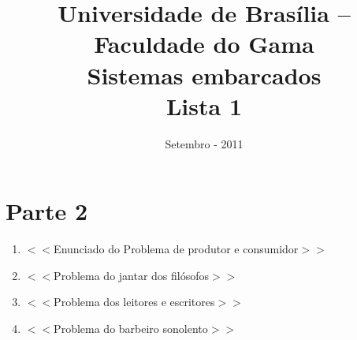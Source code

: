 \documentclass[a4paper,10pt]{article}
\title{ \textbf{Universidade de Brasília -- Faculdade do Gama \\ Sistemas embarcados \\ Lista 1 }}
\date{Setembro - 2011}
\begin{document}
\maketitle

\section{Parte 2}
  \begin{enumerate}
   \item $<<$Enunciado do Problema de produtor e consumidor$>>$
   \item $<<$Problema do jantar dos filósofos$>>$
   \item $<<$Problema dos leitores e escritores$>>$
   \item $<<$Problema do barbeiro sonolento$>>$
  \end{enumerate}
\end{document}

